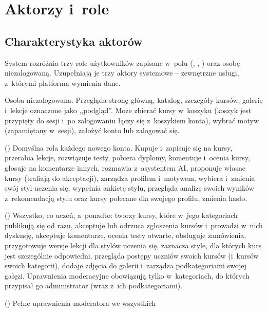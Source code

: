 \chapter{Aktorzy i~role}

\section{Charakterystyka aktorów}

System rozróżnia trzy role użytkowników zapisane w~polu 
(, , ) oraz osobę niezalogowaną. Uzupełniają je
trzy aktory systemowe -- zewnętrzne usługi, z~którymi platforma wymienia dane.

\begin{description}[style=nextline,leftmargin=0.6cm,font=\sffamily\bfseries]
  \item[Gość] Osoba niezalogowana. Przegląda stronę główną, katalog, szczegóły kursów,
        galerię i~lekcje oznaczone jako ,,podgląd''. Może zbierać kursy w~koszyku (koszyk
        jest przypięty do sesji i~po zalogowaniu łączy się z~koszykiem konta), wybrać motyw
        (zapamiętany w~sesji), założyć konto lub zalogować się.
  \item[Uczeń] () Domyślna rola każdego nowego konta. Kupuje i~zapisuje się
        na kursy, przerabia lekcje, rozwiązuje testy, pobiera dyplomy, komentuje i~ocenia
        kursy, głosuje na komentarze innych, rozmawia z~asystentem AI, proponuje własne
        kursy (trafiają do akceptacji), zarządza profilem i~motywem, wybiera i~zmienia swój styl
        uczenia się, wypełnia ankietę stylu, przegląda analizę swoich wyników z~rekomendacją stylu
        oraz kursy polecane dla swojego profilu, zmienia hasło.
  \item[Nauczyciel] () Wszystko, co uczeń, a~ponadto: tworzy kursy, które
        w~jego kategoriach publikują się od razu, akceptuje lub odrzuca zgłoszenia kursów
        i~prowadzi w~nich dyskusję, akceptuje komentarze, ocenia testy otwarte, obsługuje
        zamówienia, przygotowuje wersje lekcji dla stylów uczenia się, zaznacza style,
        dla których kurs jest szczególnie odpowiedni, przegląda postępy uczniów swoich kursów
        (i~kursów swoich kategorii), dodaje zdjęcia do galerii i~zarządza podkategoriami swojej gałęzi.
        Uprawnienia moderacyjne obowiązują tylko w~kategoriach, do których przypisał go
        administrator (wraz z~ich podkategoriami).
  \item[Administrator] () Pełne uprawnienia moderatora we wszystkich

\end{description}
